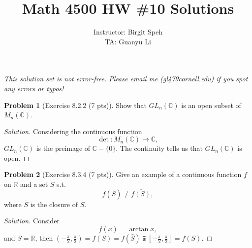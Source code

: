 \documentclass{article}
\title{Math 4500 HW \#10 Solutions}
\author{Instructor: Birgit Speh\\ TA: Guanyu Li}
\date{}
\theoremstyle{definition}
\newtheorem{problem}{Problem}
\theoremstyle{plain}
\begin{document}
\maketitle\par

\emph{This solution set is not error-free. Please email me (gl479\MVAt cornell.edu) if you spot any errors or typos!}

\begin{problem}[Exercise 8.2.2 (7 pts)]
Show that $GL_n(\mathbb{C})$ is an open subset of $M_n(\mathbb{C})$.
\end{problem}
\begin{adjustwidth}{0.7cm}{}
\color{blue}
\begin{proof}[Solution]
Considering the continuous function
\begin{displaymath}
\det:M_n(\mathbb{C})\to\mathbb{C},
\end{displaymath}
$GL_n(\mathbb{C})$ is the preimage of $\mathbb{C}-\{0\}$. The continuity tells us that $GL_n(\mathbb{C})$ is open.
\color{black}
\end{proof}
\end{adjustwidth}

\begin{problem}[Exercise 8.3.4 (7 pts)]
Give an example of a continuous function $f$ on $\mathbb{R}$ and a set $S$ s.t.
\begin{displaymath}
f(\bar{S})\neq\overline{f(S)},
\end{displaymath}
where $\bar{S}$ is the closure of $S$.
\end{problem}
\begin{adjustwidth}{0.7cm}{}
\color{blue}
\begin{proof}[Solution]
Consider
\begin{displaymath}
f(x)=\arctan x,
\end{displaymath}
and $S=\mathbb{R}$, then $(-\frac{\pi}{2},\frac{\pi}{2})=f(S)=f(\bar{S})\subsetneqq[-\frac{\pi}{2},\frac{\pi}{2}]=\overline{f(S)}$.
\color{black}
\end{proof}
\end{adjustwidth}
\end{document}
